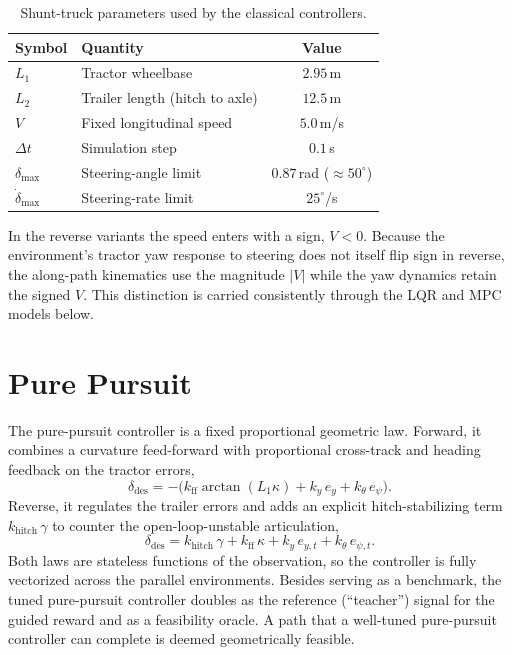 \begin{table}[H]
\centering
\caption{Shunt-truck parameters used by the classical controllers.}
\label{tab:app_cc_params}
\begin{tabular}{llc}
\toprule
Symbol & Quantity & Value \\
\midrule
$L_1$ & Tractor wheelbase & $2.95$\,m \\
$L_2$ & Trailer length (hitch to axle) & $12.5$\,m \\
$V$ & Fixed longitudinal speed & $5.0$\,m/s \\
$\Delta t$ & Simulation step & $0.1$\,s \\
$\delta_{\max}$ & Steering-angle limit & $0.87$\,rad ($\approx 50^{\circ}$) \\
$\dot{\delta}_{\max}$ & Steering-rate limit & $25^{\circ}$/s \\
\bottomrule
\end{tabular}
\end{table}

In the reverse variants the speed enters with a sign, $V < 0$. Because the environment's
tractor yaw response to steering does not itself flip sign in reverse, the along-path
kinematics use the magnitude $\lvert V \rvert$ while the yaw dynamics retain the signed
$V$. This distinction is carried consistently through the LQR and MPC models below.

\section{Pure Pursuit}
\label{sec:app_cc_pp}

The pure-pursuit controller \cite{coulter1992pure} is a fixed proportional geometric law.
Forward, it combines a curvature feed-forward with proportional cross-track and heading
feedback on the tractor errors,
\begin{equation}
    \delta_{\mathrm{des}} = -\bigl(k_{\mathrm{ff}} \arctan(L_1 \kappa)
    + k_y\, e_y + k_\theta\, e_\psi\bigr).
    \label{eq:app_cc_pp_fwd}
\end{equation}
Reverse, it regulates the trailer errors and adds an explicit hitch-stabilizing term
$k_{\mathrm{hitch}}\,\gamma$ to counter the open-loop-unstable articulation,
\begin{equation}
    \delta_{\mathrm{des}} = k_{\mathrm{hitch}}\,\gamma + k_{\mathrm{ff}}\,\kappa
    + k_y\, e_{y,t} + k_\theta\, e_{\psi,t}.
    \label{eq:app_cc_pp_rev}
\end{equation}
Both laws are stateless functions of the observation, so the controller is fully
vectorized across the parallel environments. Besides serving as a benchmark, the tuned
pure-pursuit controller doubles as the reference (``teacher'') signal for the guided
reward and as a feasibility oracle. A path that a well-tuned pure-pursuit controller can
complete is deemed geometrically feasible.


